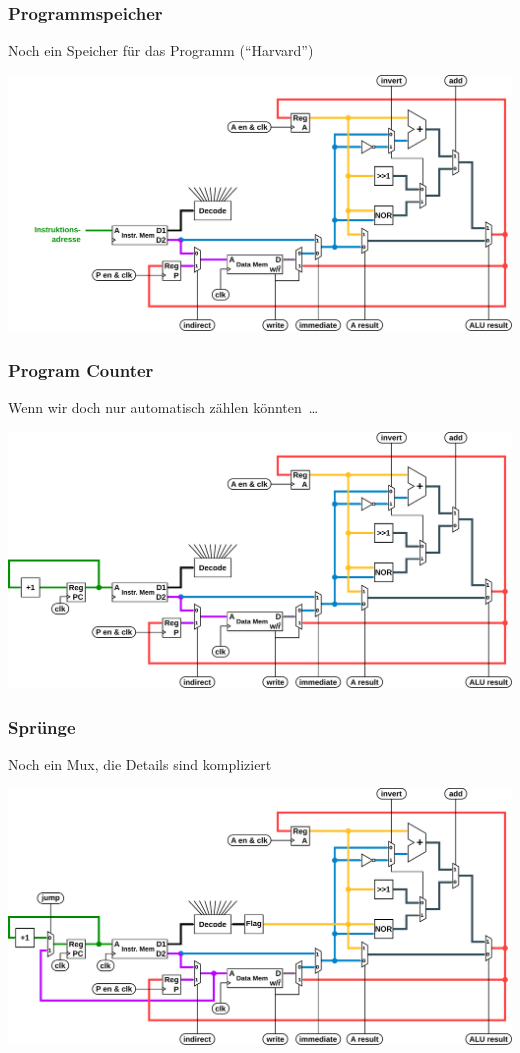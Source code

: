 \documentclass[t,aspectratio=169]{beamer}
\begin{document}
\begin{frame}
  \frametitle{Programmspeicher}

  \strut{}Noch ein Speicher für das Programm (\enquote{Harvard})

  \begin{center}
    \includegraphics[width=.85\textwidth]{sch-progmem.pdf}
  \end{center}
\end{frame}

\begin{frame}
  \frametitle{Program Counter}

  \strut{}Wenn wir doch nur automatisch zählen könnten~\ldots

  \begin{center}
    \includegraphics[width=.85\textwidth]{sch-pc.pdf}
  \end{center}
\end{frame}

\begin{frame}
  \frametitle{Sprünge}

  \strut{}Noch ein Mux, die Details sind kompliziert

  \begin{center}
    \includegraphics[width=.85\textwidth]{schematic.pdf}
  \end{center}
\end{frame}
\end{document}
